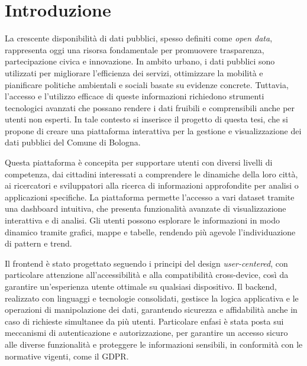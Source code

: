 %
\chapter*{Introduzione}
La crescente disponibilità di dati pubblici, spesso definiti come \textit{open data}, rappresenta oggi una risorsa fondamentale per promuovere trasparenza, partecipazione civica e innovazione. In ambito urbano, i dati pubblici sono utilizzati per migliorare l’efficienza dei servizi, ottimizzare la mobilità e pianificare politiche ambientali e sociali basate su evidenze concrete. Tuttavia, l’accesso e l’utilizzo efficace di queste informazioni richiedono strumenti tecnologici avanzati che possano rendere i dati fruibili e comprensibili anche per utenti non esperti. In tale contesto si inserisce il progetto di questa tesi, che si propone di creare una piattaforma interattiva per la gestione e visualizzazione dei dati pubblici del Comune di Bologna.

Questa piattaforma è concepita per supportare utenti con diversi livelli di competenza, dai cittadini interessati a comprendere le dinamiche della loro città, ai ricercatori e sviluppatori alla ricerca di informazioni approfondite per analisi o applicazioni specifiche. La piattaforma permette l’accesso a vari dataset tramite una dashboard intuitiva, che presenta funzionalità avanzate di visualizzazione interattiva e di analisi. Gli utenti possono esplorare le informazioni in modo dinamico tramite grafici, mappe e tabelle, rendendo più agevole l'individuazione di pattern e trend.

Il frontend è stato progettato seguendo i principi del design \textit{user-centered}, con particolare attenzione all’accessibilità e alla compatibilità cross-device, così da garantire un’esperienza utente ottimale su qualsiasi dispositivo. Il backend, realizzato con linguaggi e tecnologie consolidati, gestisce la logica applicativa e le operazioni di manipolazione dei dati, garantendo sicurezza e affidabilità anche in caso di richieste simultanee da più utenti. Particolare enfasi è stata posta sui meccanismi di autenticazione e autorizzazione, per garantire un accesso sicuro alle diverse funzionalità e proteggere le informazioni sensibili, in conformità con le normative vigenti, come il GDPR.

